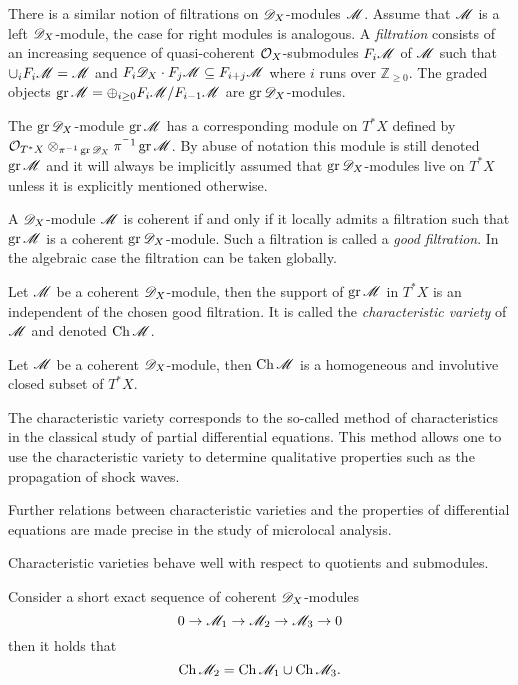 There is a similar notion of filtrations on $\mathscr{D}_X$-modules $\mathscr{M}$.
Assume that $\mathscr{M}$ is a left $\mathscr{D}_X$-module, the case for right modules is analogous.
A {\it filtration} consists of an increasing sequence of quasi-coherent $\mathcal{O}_X$-submodules $F_i\mathscr{M}$ of $\mathscr{M}$ such that $\cup_i F_i \mathscr{M} = \mathscr{M}$ and $F_i\mathscr{D}_X \cdot F_j\mathscr{M} \subseteq F_{i+j}\mathscr{M}$ where $i$ runs over $\mathbb{Z}_{\geq 0}$.
The graded objects $\operatorname{gr}\mathscr{M} = \oplus_{i\geq 0} F_i\mathscr{M}/F_{i-1}\mathscr{M}$ are $\operatorname{gr}\mathscr{D}_X$-modules.

The $\operatorname{gr}\mathscr{D}_X$-module $\operatorname{gr}\mathscr{M}$ has a corresponding module on $T^* X$ defined by $\mathcal{O}_{T^*X} \otimes_{\pi^{-1}\operatorname{gr} \mathscr{D}_X} \pi^{^-1}\operatorname{gr}\mathscr{M}$.
By abuse of notation this module is still denoted $\operatorname{gr}\mathscr{M}$ and it will always be implicitly assumed that $\operatorname{gr} \mathscr{D}_X$-modules live on $T^*X$ unless it is explicitly mentioned otherwise.
\begin{proposition}{\cite[Theorem 2.1.3., Section 4.1 ]{hotta2007d}}\label{prop: GoodFiltration}
  A $\mathscr{D}_X$-module $\mathscr{M}$ is coherent if and only if it locally admits a filtration such that $\operatorname{gr} \mathscr{M}$ is a coherent $\operatorname{gr} \mathscr{D}_X$-module. Such a filtration is called a {\it good filtration}.
  In the algebraic case the filtration can be taken globally.
\end{proposition}
\begin{proposition}{\cite[Theorem 2.2.1.]{hotta2007d}}
  Let $\mathscr{M}$ be a coherent $\mathscr{D}_X$-module, then the support of $\operatorname{gr}\mathscr{M}$ in $T^* X$ is an independent of the chosen good filtration.
  It is called the {\it characteristic variety} of $\mathscr{M}$ and denoted $\operatorname{Ch} \mathscr{M}$.
\end{proposition}
\begin{proposition}{\cite[Theorem 2.3.1,  2]{hotta2007d}}\label{prop: StructureChVar}
  Let $\mathscr{M}$ be a coherent $\mathscr{D}_X$-module, then $\operatorname{Ch} \mathscr{M}$ is a homogeneous and involutive closed subset of $T^* X$.
\end{proposition}
\begin{remark}
  The characteristic variety corresponds to the so-called method of characteristics in the classical study of partial differential equations.
  This method allows one to use the characteristic variety to determine qualitative properties such as the propagation of shock waves.

  Further relations between characteristic varieties and the properties of differential equations are made precise in the study of microlocal analysis.
\end{remark}
Characteristic varieties behave well with respect to quotients and submodules.
\begin{proposition}\label{prop: SESBehaviourChar}
  Consider a short exact sequence of coherent $\mathscr{D}_X$-modules
  $$0 \to \mathscr{M}_1 \to \mathscr{M}_2 \to \mathscr{M}_3 \to 0 $$
  then it holds that
  $$\operatorname{Ch} \mathscr{M}_2 = \operatorname{Ch} \mathscr{M}_1 \cup \operatorname{Ch} \mathscr{M}_3. $$
\end{proposition}
